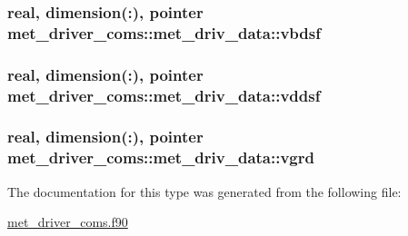 \subsubsection[{vbdsf}]{\setlength{\rightskip}{0pt plus 5cm}real, dimension(\+:), pointer met\+\_\+driver\+\_\+coms\+::met\+\_\+driv\+\_\+data\+::vbdsf}\label{structmet__driver__coms_1_1met__driv__data_a076a15466aba5e50972a1cee79503844}
\hypertarget{structmet__driver__coms_1_1met__driv__data_aadd9f7e24cc74f369724dd6443717e69}{}
\subsubsection[{vddsf}]{\setlength{\rightskip}{0pt plus 5cm}real, dimension(\+:), pointer met\+\_\+driver\+\_\+coms\+::met\+\_\+driv\+\_\+data\+::vddsf}\label{structmet__driver__coms_1_1met__driv__data_aadd9f7e24cc74f369724dd6443717e69}
\hypertarget{structmet__driver__coms_1_1met__driv__data_a1bdf2521eb3332db96d2127a7d5a0294}{}
\subsubsection[{vgrd}]{\setlength{\rightskip}{0pt plus 5cm}real, dimension(\+:), pointer met\+\_\+driver\+\_\+coms\+::met\+\_\+driv\+\_\+data\+::vgrd}\label{structmet__driver__coms_1_1met__driv__data_a1bdf2521eb3332db96d2127a7d5a0294}


The documentation for this type was generated from the following file\+:\begin{DoxyCompactItemize}
\item 
\hyperlink{met__driver__coms_8f90}{met\+\_\+driver\+\_\+coms.\+f90}\end{DoxyCompactItemize}
